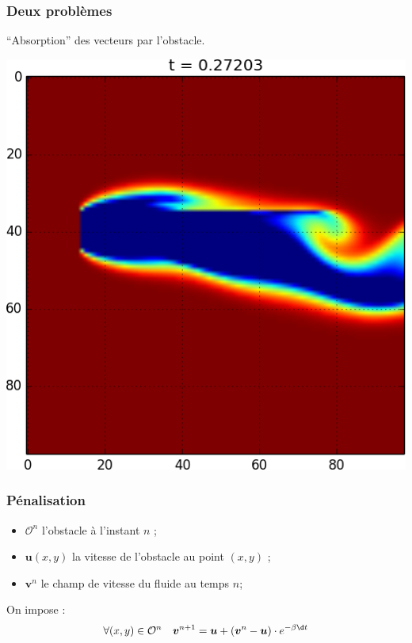 \documentclass{beamer}
\renewcommand\O{\mathcal{O}}
\newcommand{\vect}[1]{\boldsymbol{#1}}
\begin{document}
  \begin{frame}
    \frametitle{Deux problèmes}
    ``Absorption'' des vecteurs par l'obstacle.
    \begin{center}
      \includegraphics[height=0.7\textheight]{absorption.png}
    \end{center}
  \end{frame}

  \begin{frame}
    \frametitle{Pénalisation}
    \begin{itemize}
    \item $\O^n$ l'obstacle à l'instant $n$ ;
    \item $\vect{u}(x,y)$ la vitesse de l'obstacle au point $(x,y)$ ;
    \item $\vect{v}^n$ le champ de vitesse du fluide au temps $n$;
    \end{itemize}
    On impose :
    \[ \forall (x,y) \in \O^n\quad \vect{v}^{n+1} =
    \vect{u} + (\vect{v}^n - \vect{u})\cdot e^{-\beta \d  t} \]
  \end{frame}
\end{document}
